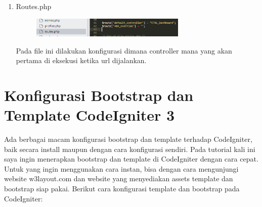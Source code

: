 \begin{enumerate}
	\item Routes.php
		\begin{figure}[!htbp]
    		\centering
    		\includegraphics[width=0.7\textwidth]{figures/CodeIgniter5.PNG}
    		\label{CodeIgniter5}
		\end{figure}
		\par Pada file ini dilakukan konfigurasi dimana controller mana yang akan pertama di eksekusi ketika url dijalankan.
\end{enumerate}

\section{Konfigurasi Bootstrap dan Template CodeIgniter 3}
Ada berbagai macam konfigurasi bootstrap dan template terhadap CodeIgniter, baik secara install maupun dengan cara konfigurasi sendiri. Pada tutorial kali ini saya ingin menerapkan bootstrap dan template di CodeIgniter dengan cara cepat. Untuk yang ingin menggunakan cara instan, bisa dengan cara mengunjungi website w3layout.com dan website yang menyediakan assets template dan bootstrap siap pakai. Berikut cara konfigurasi template dan bootstrap pada CodeIgniter:
